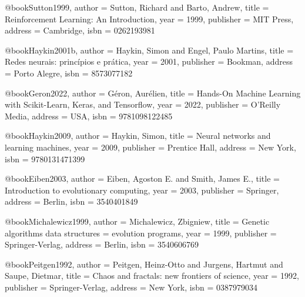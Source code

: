 @book{Sutton1999,
  author = {Sutton, Richard and Barto, Andrew},
  title = {Reinforcement Learning: An Introduction},
  year = {1999},
  publisher = {MIT Press},
  address = {Cambridge},
  isbn = {0262193981}
}

@book{Haykin2001b,
  author = {Haykin, Simon and Engel, Paulo Martins},
  title = {Redes neurais: princípios e prática},
  year = {2001},
  publisher = {Bookman},
  address = {Porto Alegre},
  isbn = {8573077182}
}

@book{Geron2022,
  author = {Géron, Aurélien},
  title = {Hands-On Machine Learning with Scikit-Learn, Keras, and Tensorflow},
  year = {2022},
  publisher = {O'Reilly Media},
  address = {USA},
  isbn = {9781098122485}
}

@book{Haykin2009,
  author = {Haykin, Simon},
  title = {Neural networks and learning machines},
  year = {2009},
  publisher = {Prentice Hall},
  address = {New York},
  isbn = {9780131471399}
}

%

@book{Eiben2003,
  author = {Eiben, Agoston E. and Smith, James E.},
  title = {Introduction to evolutionary computing},
  year = {2003},
  publisher = {Springer},
  address = {Berlin},
  isbn = {3540401849}
}

@book{Michalewicz1999,
  author = {Michalewicz, Zbigniew},
  title = {Genetic algorithms data structures = evolution programs},
  year = {1999},
  publisher = {Springer-Verlag},
  address = {Berlin},
  isbn = {3540606769}
}

@book{Peitgen1992,
  author = {Peitgen, Heinz-Otto and Jurgens, Hartmut and Saupe, Dietmar},
  title = {Chaos and fractals: new frontiers of science},
  year = {1992},
  publisher = {Springer-Verlag},
  address = {New York},
  isbn = {0387979034}
}

